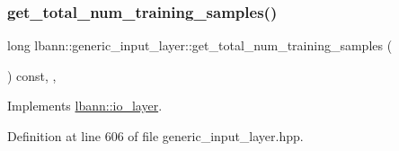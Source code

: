 \subsubsection{\texorpdfstring{get\+\_\+total\+\_\+num\+\_\+training\+\_\+samples()}{get\_total\_num\_training\_samples()}}
{\footnotesize\ttfamily long lbann\+::generic\+\_\+input\+\_\+layer\+::get\+\_\+total\+\_\+num\+\_\+training\+\_\+samples (\begin{DoxyParamCaption}{ }\end{DoxyParamCaption}) const\hspace{0.3cm}{\ttfamily [inline]}, {\ttfamily [override]}, {\ttfamily [virtual]}}



Implements \hyperlink{classlbann_1_1io__layer_a744fe02208657194120714387b49cb28}{lbann\+::io\+\_\+layer}.



Definition at line 606 of file generic\+\_\+input\+\_\+layer.\+hpp.



